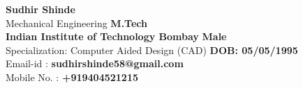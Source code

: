 \documentclass[a4paper,10pt]{article}
\begin{document}
\renewcommand{\arraystretch}{1.2}

\textbf{Sudhir Shinde} \hspace{6.5cm}   \\
\indent Mechanical Engineering     \hspace{5.43cm}  \textbf{M.Tech} \\
\indent \textbf{Indian Institute of Technology Bombay}  \hspace{2.9cm}  \textbf{Male} \\
\indent Specialization: Computer Aided Design (CAD) \hspace{1.9cm}  \textbf{DOB: 05/05/1995}\\
\indent Email-id : \textbf{sudhirshinde58@gmail.com} \\
\indent Mobile No. : \textbf{+919404521215} \\
\end{document}
